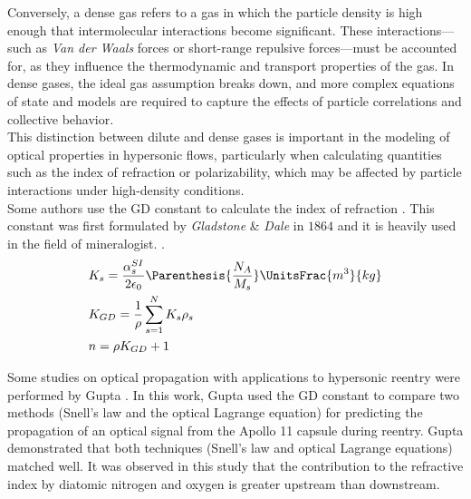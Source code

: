     Conversely, a dense gas refers to a gas in which the particle density is
    high enough that intermolecular interactions become significant. These
    interactions—such as \textit{Van der Waals} forces or short-range repulsive
    forces—must be accounted for, as they influence the thermodynamic and
    transport properties of the gas. In dense gases, the ideal gas assumption
    breaks down, and more complex equations of state and models are required to
    capture the effects of particle correlations and collective behavior. \\

    This distinction between dilute and dense gases is important in the
    modeling of optical properties in hypersonic flows, particularly when
    calculating quantities such as the index of refraction or polarizability,
    which may be affected by particle interactions under high-density
    conditions. \\
    
    Some authors \cite{Mandarino1976, Mandarino1981, Wang2023, Miller2022,
    Gupta2023} use the \gls{GD}  constant to
    calculate the index of refraction . This
    constant was first formulated by \textit{Gladstone} \& \textit{Dale} in
    $1864$ and it is heavily used in the field of mineralogist.
    \cite{Mandarino1976}. 
    \begin{subequations}
        \begin{align}
            &K_s =
            \frac{\alpha^{SI}_s}{2\epsilon_0}\Parenthesis{\frac{N_A}{M_s}} \UnitsFrac{m^3}{kg}
            \label{eq:speciesGladstoneDaleConst} \\
            &K_{GD} = \frac{1}{\rho}\sum\limits_{s=1}^N K_s\rho_s \label{eq:gladstoneDaleConst} \\
            &n = \rho K_{GD} + 1 \label{eq:gladstoneDaleRelationship}
        \end{align}
    \end{subequations}

    Some studies on optical propagation with applications to hypersonic
    reentry were performed by Gupta \cite{Gupta2023}. In this work, Gupta
    used the \gls{GD} constant to compare two methods (Snell’s law
    and the optical Lagrange equation) for predicting the propagation of an
    optical signal from the Apollo 11 capsule during reentry. Gupta
    demonstrated that both techniques (Snell’s law and optical Lagrange
    equations) matched well. It was observed in this study that the
    contribution to the refractive index by diatomic nitrogen and oxygen is
    greater upstream than downstream.\\ 


